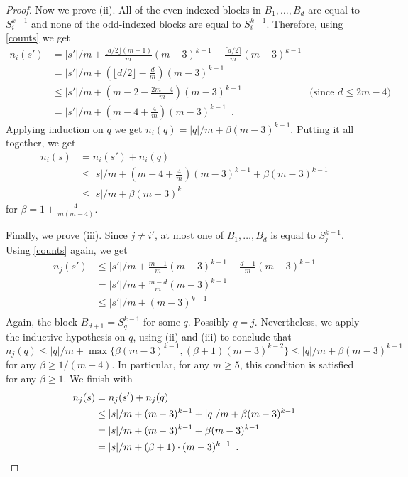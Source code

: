 \documentclass[kpfonts]{patmorin}
\begin{document}
\begin{proof}
    Now we prove (ii). All of the even-indexed blocks in $B_1,\ldots,B_d$ are equal to $S_i^{k-1}$ and none of the odd-indexed blocks are equal to $S_i^{k-1}$.  Therefore, using \cref{counts} we get
    \begin{align*}
        n_i(s') & = |s'|/m + \tfrac{\lfloor d/2\rfloor(m-1)}{m}(m-3)^{k-1} - \tfrac{\lceil d/2\rceil}{m}(m-3)^{k-1} \\
         & = |s'|/m + (\lfloor d/2\rfloor - \tfrac{d}{m})(m-3)^{k-1} \\
         & \le |s'|/m + (m-2-\tfrac{2m-4}{m})(m-3)^{k-1} & \text{(since $d\le 2m-4$)}\\
         & = |s'|/m + (m-4+\tfrac{4}{m})(m-3)^{k-1} \enspace .
    \end{align*}
    Applying induction on $q$ we get $n_i(q) = |q|/m + \beta(m-3)^{k-1}$.
    Putting it all together, we get
    \begin{align*}
        n_i(s) & = n_i(s')+n_i(q) \\
               & \le |s|/m + (m-4+\tfrac{4}{m})(m-3)^{k-1} + \beta(m-3)^{k-1} \\
        & \le |s|/m + \beta(m-3)^{k}
    \end{align*}
    for $\beta = 1+\tfrac{4}{m(m-4)}$.

    Finally, we prove (iii).  Since $j\neq i'$, at most one of $B_1,\ldots,B_d$ is equal to $S_j^{k-1}$.  Using \cref{counts} again, we get
    \begin{align*}
        n_j(s') & \le |s'|/m + \tfrac{m-1}{m}(m-3)^{k-1} - \tfrac{d-1}{m}(m-3)^{k-1} \\
        & = |s'|/m + \tfrac{m-d}{m}(m-3)^{k-1} \\
        & \le |s'|/m + (m-3)^{k-1} \\
    \end{align*}
    Again, the block $B_{d+1}=S_{q}^{k-1}$ for some $q$. Possibly $q=j$.  Nevertheless, we apply the inductive hypothesis on $q$, using (ii) and (iii) to conclude that
    \[  n_j(q) \le |q|/m + \max\{\beta(m-3)^{k-1},(\beta+1)(m-3)^{k-2}\} \le |q|/m + \beta(m-3)^{k-1} \]
    for any $\beta\ge 1/(m-4)$.  In particular, for any $m\ge 5$, this condition is satisfied for any $\beta \ge 1$.
    We finish with
    \begin{align*}
      n_j(s) & = n_j(s')+n_j(q) \\
         & \le |s|/m + (m-3)^{k-1} + |q|/m + \beta(m-3)^{k-1} \\
         & = |s|/m + (m-3)^{k-1} + \beta(m-3)^{k-1} \\
         & = |s|/m + (\beta+1)\cdot(m-3)^{k-1} \enspace . \qedhere
    \end{align*}
\end{proof}
\end{document}

